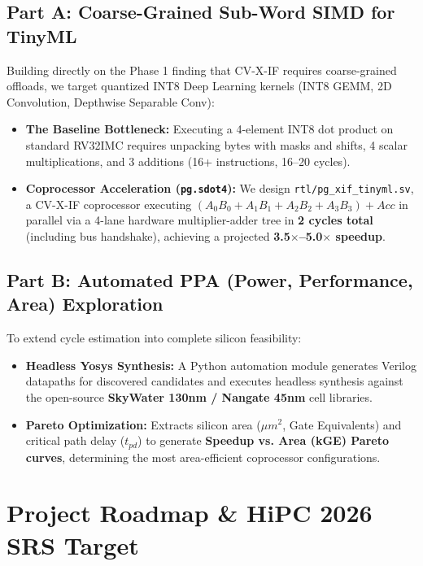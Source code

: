 \documentclass[11pt,a4paper]{article}
\begin{document}
\subsection{Part A: Coarse-Grained Sub-Word SIMD for TinyML}
Building directly on the Phase 1 finding that CV-X-IF requires coarse-grained offloads, we target quantized INT8 Deep Learning kernels (INT8 GEMM, 2D Convolution, Depthwise Separable Conv):
\begin{itemize}[leftmargin=*]
    \item \textbf{The Baseline Bottleneck:} Executing a 4-element INT8 dot product on standard RV32IMC requires unpacking bytes with masks and shifts, 4 scalar multiplications, and 3 additions (16+ instructions, 16--20 cycles).
    \item \textbf{Coprocessor Acceleration (\texttt{pg.sdot4}):} We design \texttt{rtl/pg\_xif\_tinyml.sv}, a CV-X-IF coprocessor executing $(A_0 B_0 + A_1 B_1 + A_2 B_2 + A_3 B_3) + Acc$ in parallel via a 4-lane hardware multiplier-adder tree in \textbf{2 cycles total} (including bus handshake), achieving a projected \textbf{3.5$\times$--5.0$\times$ speedup}.
\end{itemize}

\subsection{Part B: Automated PPA (Power, Performance, Area) Exploration}
To extend cycle estimation into complete silicon feasibility:
\begin{itemize}[leftmargin=*]
    \item \textbf{Headless Yosys Synthesis:} A Python automation module generates Verilog datapaths for discovered candidates and executes headless synthesis against the open-source \textbf{SkyWater 130nm / Nangate 45nm} cell libraries.
    \item \textbf{Pareto Optimization:} Extracts silicon area ($\mu m^2$, Gate Equivalents) and critical path delay ($t_{pd}$) to generate \textbf{Speedup vs. Area (kGE) Pareto curves}, determining the most area-efficient coprocessor configurations.
\end{itemize}

\section{Project Roadmap \& HiPC 2026 SRS Target}
\end{document}
